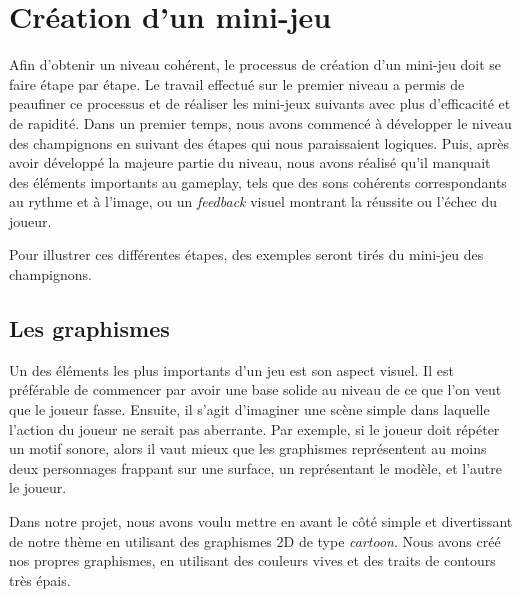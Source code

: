 \section{Création d'un mini-jeu}

Afin d'obtenir un niveau cohérent, le processus de création d'un mini-jeu doit se faire étape par étape. Le travail effectué sur le premier niveau a permis de peaufiner ce processus et de réaliser les mini-jeux suivants avec plus d'efficacité et de rapidité. Dans un premier temps, nous avons commencé à développer le niveau des champignons en suivant des étapes qui nous paraissaient logiques. Puis, après avoir développé la majeure partie du niveau, nous avons réalisé qu'il manquait des éléments importants au gameplay, tels que des sons cohérents correspondants au rythme et à l'image, ou un \textit{feedback} visuel montrant la réussite ou l'échec du joueur.

Pour illustrer ces différentes étapes, des exemples seront tirés du mini-jeu des champignons.

\subsection{Les graphismes}

Un des éléments les plus importants d'un jeu est son aspect visuel. Il est préférable de commencer par avoir une base solide au niveau de ce que l'on veut que le joueur fasse. Ensuite, il s'agit d'imaginer une scène simple dans laquelle l'action du joueur ne serait pas aberrante. Par exemple, si le joueur doit répéter un motif sonore, alors il vaut mieux que les graphismes représentent au moins deux personnages frappant sur une surface, un représentant le modèle, et l'autre le joueur.

Dans notre projet, nous avons voulu mettre en avant le côté simple et divertissant de notre thème en utilisant des graphismes 2D de type \textit{cartoon}. Nous avons créé nos propres graphismes, en utilisant des couleurs vives et des traits de contours très épais.


